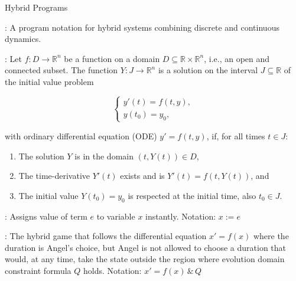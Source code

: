 \documentclass[hidelinks]{article}
\begin{document}
\begin{smodule}[title={Hybrid Systems}]{Hybrid Programs}
    \begin{sdefinition}[for=HybridProgram]
        : A program notation for hybrid systems combining discrete and continuous dynamics.
    \end{sdefinition}
    \begin{sdefinition}[for=ODE]
        : Let $f : D \to \mathbb{R}^n$ be a function on a domain $D \subseteq \mathbb{R} \times \mathbb{R}^n$, i.e., an open and connected subset. The function $Y : J \to \mathbb{R}^n$ is a solution on the interval $J \subseteq \mathbb{R}$ of the initial value problem

        \[
        \begin{cases}
        y'(t) = f(t, y), \\
        y(t_0) = y_0,
        \end{cases}
        \]
        
        with ordinary differential equation (ODE) $y' = f(t, y)$, if, for all times $t \in J$:
        \begin{enumerate}
            \item The solution $Y$ is in the domain $(t, Y(t)) \in D$,
            \item The time-derivative $Y'(t)$ exists and is $Y'(t) = f(t, Y(t))$, and
            \item The initial value $Y(t_0) = y_0$ is respected at the initial time, also $t_0 \in J$.
        \end{enumerate}
    \end{sdefinition}
    \begin{sdefinition}[for=DiscreteAssignment]
        : Assigns value of term $e$ to variable $x$ instantly. Notation: $x := e$
    \end{sdefinition}

    \begin{sdefinition}[for=ContinuousEvolution]
        : The hybrid game that follows the differential equation $x' = f(x)$ where the duration is Angel's choice, but Angel is not allowed to choose a duration that would, at any time, take the state outside the region where evolution domain constraint formula $Q$ holds. Notation: $x' = f(x) \, \& \, Q$
    \end{sdefinition}


\end{smodule}
\end{document}
